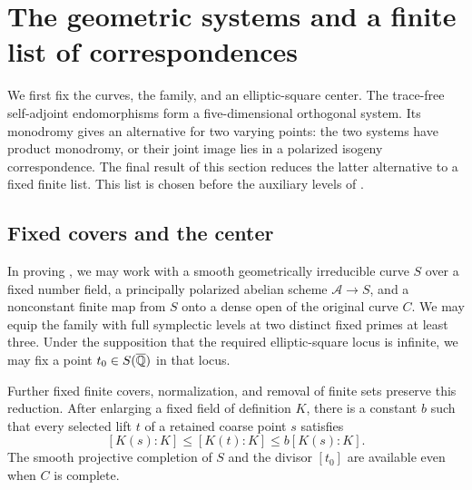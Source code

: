 \section{The geometric systems and a finite list of correspondences}
\label{geo:section}

We first fix the curves, the family, and an elliptic-square center.  The
trace-free self-adjoint endomorphisms form a five-dimensional orthogonal
system.  Its monodromy gives an alternative for two varying points: the
two systems have product monodromy, or their joint image lies in a
polarized isogeny correspondence.  The final result of this section
reduces the latter alternative to a fixed finite list.  This list is
chosen before the auxiliary levels of .

\subsection{Fixed covers and the center}

\begin{proposition}\label{geo:setup}
In proving , we may work with a smooth geometrically
irreducible curve $S$ over a fixed number field, a principally polarized
abelian scheme $\mathscr A\to S$, and a nonconstant finite map from $S$
onto a dense open of the original curve $C$.  We may equip the family
with full symplectic levels at two distinct fixed primes at least three.
Under the supposition that the required elliptic-square locus is
infinite, we may fix a point $t_0\in S(\overline{\mathbb Q})$ in that locus.

Further fixed finite covers, normalization, and removal of finite sets
preserve this reduction.  After enlarging a fixed field of definition
$K$, there is a constant $b$ such that every selected lift $t$ of a
retained coarse point $s$ satisfies
\begin{equation}\label{geo:degree-descent}
 [K(s):K]\leq [K(t):K]\leq b[K(s):K].
\end{equation}
The smooth projective completion of $S$ and the divisor $[t_0]$ are
available even when $C$ is complete.
\end{proposition}

